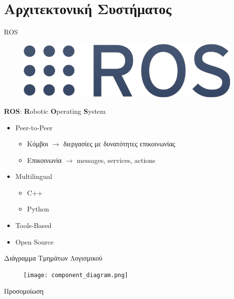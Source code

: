 \documentclass[10pt, compress, handout]{beamer} %
\begin{document}
\section{Αρχιτεκτονική Συστήματος}

\begin{frame}{ROS}
	\begin{figure}
		\includegraphics[width=0.4\linewidth]{Figures/ros.png}
	\end{figure}
	\textbf{ROS}: \textbf{R}obotic \textbf{O}perating \textbf{S}ystem
	\begin{itemize}
		\item Peer-to-Peer
			\begin{itemize}
				\item Κόμβοι $\rightarrow$ διεργασίες με δυνατότητες επικοινωνίας
				\item Επικοινωνία $\rightarrow$ messages, services, actions
			\end{itemize}
		\item Multilingual
			\begin{itemize}
				\item C++
				\item Python
			\end{itemize}
		\item Tools-Based
		\item Open Source
	\end{itemize}
\end{frame}

\begin{frame}{Διάγραμμα Τμημάτων Λογισμικού}
	\begin{figure}
		\texttt{[image: component\_diagram.png]}
	\end{figure}
\end{frame}

\begin{frame}{Προσομοίωση}	
	\begin{figure}
	\end{figure}
\end{frame}
\end{document}
